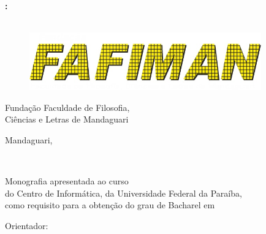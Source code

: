 \documentclass{tcc}
\begin{document}
\pagestyle{empty} %


\begin{center}
\LARGE{\bf \thetitle:}\\
\Large{\bf \subtitulo}\\
\end{center}

\vspace{1em}

\begin{center}
\theauthor
\end{center}

\vfill


\begin{figure}[H]
\centering
\includegraphics[width=100mm]{imagens/logo2.jpg}
\end{figure}

\begin{center}
Fundação Faculdade de Filosofia, \\ 
Ciências e Letras de Mandaguari

\end{center}

\vspace{2in}

\begin{center}
Mandaguari, \the\year
\end{center}
\afterpage{\blankpage \addtocounter{page}{1}} %

\newpage
\begin{center}
\theauthor
\end{center}
\vspace{3in}
\begin{center}
\LARGE{\thetitle}\\
\end{center}

\vspace{2in}

\begin{flushright}
Monografia apresentada ao curso \nomedocurso \\ do Centro de Informática, da Universidade Federal da Paraíba, \\ como requisito para a obtenção do grau de Bacharel em \titulobar
\\
\vspace{0.2in}

Orientador: \orientador


\end{flushright}
\end{document}
